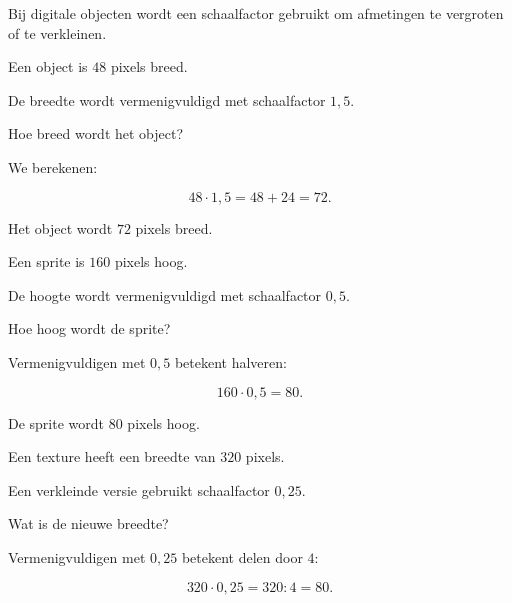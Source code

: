 \documentclass{ximera}
\begin{document}
\begin{oefening}[Schaalfactoren]{\oefU}

Bij digitale objecten wordt een schaalfactor gebruikt om afmetingen te
vergroten of te verkleinen.

\begin{question}

Een object is \(48\) pixels breed.

De breedte wordt vermenigvuldigd met schaalfactor \(1{,}5\).

Hoe breed wordt het object?

\begin{oplossing}

We berekenen:

\[
48\cdot1{,}5
=
48+24
=
72.
\]

Het object wordt \(72\) pixels breed.

\end{oplossing}

\end{question}


\begin{question}

Een sprite is \(160\) pixels hoog.

De hoogte wordt vermenigvuldigd met schaalfactor \(0{,}5\).

Hoe hoog wordt de sprite?

\begin{oplossing}

Vermenigvuldigen met \(0{,}5\) betekent halveren:

\[
160\cdot0{,}5=80.
\]

De sprite wordt \(80\) pixels hoog.

\end{oplossing}

\end{question}


\begin{question}

Een texture heeft een breedte van \(320\) pixels.

Een verkleinde versie gebruikt schaalfactor \(0{,}25\).

Wat is de nieuwe breedte?

\begin{oplossing}

Vermenigvuldigen met \(0{,}25\) betekent delen door \(4\):

\[
320\cdot0{,}25
=
320:4
=
80.
\]


\end{oplossing}
\end{question}
\end{oefening}
\end{document}
